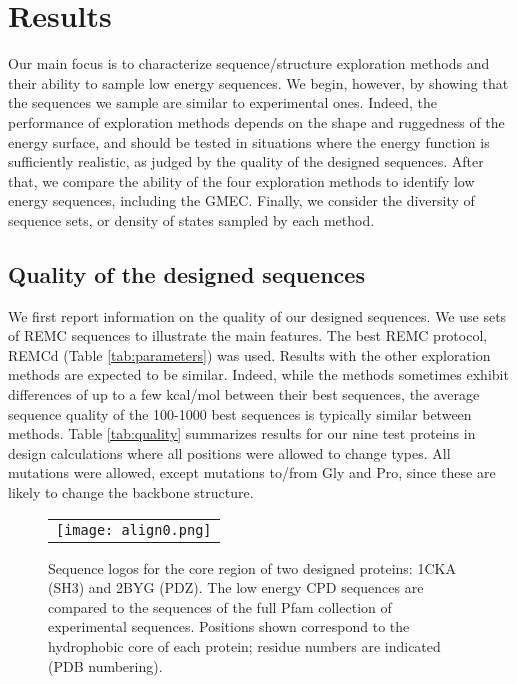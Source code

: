 \section{Results}
Our main focus is to characterize sequence/structure exploration methods and their ability to sample low energy sequences. We begin, however, by showing that the sequences we sample are similar to experimental ones. Indeed, the performance of exploration methods depends on the shape and ruggedness of the energy surface, and should be tested in situations where the energy function is sufficiently realistic, as judged by the quality of the designed sequences. After that, we compare the ability of the four exploration methods to identify low energy sequences, including the GMEC. Finally, we consider the diversity of sequence sets, or density of states sampled by each method.

\subsection{Quality of the designed sequences}
We first report information on the quality of our designed sequences. We use sets of REMC sequences to illustrate the main features. The best REMC protocol, REMCd (Table \ref{tab:parameters}) was used. Results with the other exploration methods are expected to be similar. Indeed, while the methods sometimes exhibit differences of up to a few kcal/mol between their best sequences, the average sequence quality of the 100-1000 best sequences is typically similar between methods. Table \ref{tab:quality} summarizes results for our nine test proteins in design calculations where all positions were allowed to change types. All mutations were allowed, except mutations to/from Gly and Pro, since these are likely to change the backbone structure.

\begin{figure}[!htbp]
  \centering
      \begin{tabular}{c}
        \texttt{[image: align0.png]} 
      \end{tabular}
      \caption[width=1cm]{\small 
Sequence logos for the core region of two designed proteins: 1CKA (SH3) and 2BYG (PDZ). The low energy CPD sequences are compared to the sequences of the full Pfam collection of
experimental sequences. Positions shown correspond to the hydrophobic core of each protein; residue numbers are indicated (PDB numbering).
}
      \label{fig:logos}
\end{figure}

